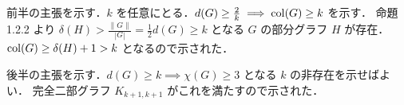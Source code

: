\subsection{}
前半の主張を示す．$k$ を任意にとる．$d(G)\geq \frac2 k\implies \operatorname{col}(G)\geq k$ を示す．
命題1.2.2 より $\delta(H) > \frac{\|G\|}{|G|} = \frac12 d(G) \geq k$ となる $G$ の部分グラフ $H$ が存在．
$\operatorname{col}(G) \geq \delta(H) + 1 > k$ となるので示された．

後半の主張を示す．$d(G)\geq k \implies \chi(G)\geq 3$ となる $k$ の非存在を示せばよい．
完全二部グラフ $K_{k+1,k+1}$ がこれを満たすので示された．
